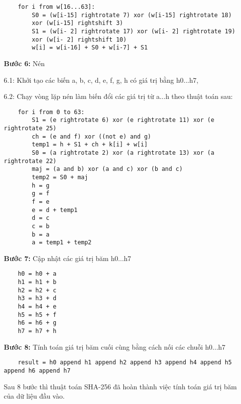 \begin{itemize}
\begin{mybox}
    \begin{lstlisting}
    for i from w[16...63]:
        S0 = (w[i-15] rightrotate 7) xor (w[i-15] rightrotate 18)
        xor (w[i-15] rightshift 3)
        S1 = (w[i- 2] rightrotate 17) xor (w[i- 2] rightrotate 19)
        xor (w[i- 2] rightshift 10)
        w[i] = w[i-16] + S0 + w[i-7] + S1
    \end{lstlisting}
\end{mybox}
    \item[\textbf{Bước 6:}] Nén
    \item[6.1:] Khởi tạo các biến a, b, c, d, e, f, g, h có giá trị bằng h0...h7,
    \item[6.2:] Chạy vòng lặp nén làm biến đổi các giá trị từ a...h theo thuật toán sau:
\begin{mybox}
    \begin{lstlisting}
    for i from 0 to 63:
        S1 = (e rightrotate 6) xor (e rightrotate 11) xor (e rightrotate 25)
        ch = (e and f) xor ((not e) and g)
        temp1 = h + S1 + ch + k[i] + w[i]
        S0 = (a rightrotate 2) xor (a rightrotate 13) xor (a rightrotate 22)
        maj = (a and b) xor (a and c) xor (b and c)
        temp2 = S0 + maj
        h = g
        g = f
        f = e
        e = d + temp1
        d = c
        c = b
        b = a
        a = temp1 + temp2
    \end{lstlisting}
\end{mybox}
    \item[\textbf{Bước 7:}] Cập nhật các giá trị băm h0...h7
\begin{mybox}
    \begin{lstlisting}
    h0 = h0 + a
    h1 = h1 + b
    h2 = h2 + c
    h3 = h3 + d
    h4 = h4 + e
    h5 = h5 + f
    h6 = h6 + g
    h7 = h7 + h
    \end{lstlisting}
\end{mybox}
\item[\textbf{Bước 8:}] Tính toán giá trị băm cuối cùng bằng cách nối các chuỗi h0...h7
\begin{mybox}
    \begin{lstlisting}
    result = h0 append h1 append h2 append h3 append h4 append h5 append h6 append h7
    \end{lstlisting}
\end{mybox}

Sau 8 bước thì thuật toán SHA-256 đã hoàn thành việc tính toán giá trị băm của dữ liệu đầu vào. \cite{Sha256}
\end{itemize}


